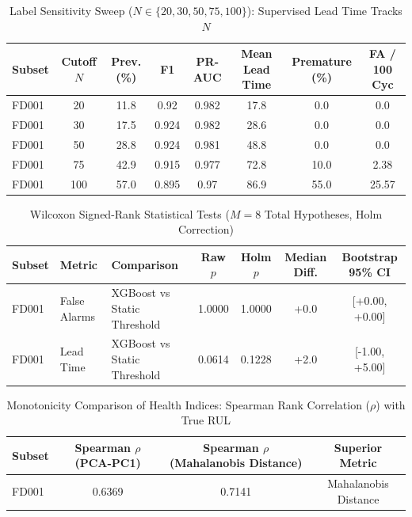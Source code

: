 \begin{table}[htbp]
\centering
\small
\caption{Label Sensitivity Sweep ($N \in \{20, 30, 50, 75, 100\}$): Supervised Lead Time Tracks $N$}
\label{tab:label_sensitivity_sweep}
\begin{tabular}{lccccccc}
\toprule
\textbf{Subset} & \textbf{Cutoff $N$} & \textbf{Prev. (\%)} & \textbf{F1} & \textbf{PR-AUC} & \textbf{Mean Lead Time} & \textbf{Premature (\%)} & \textbf{FA / 100 Cyc} \\
\midrule
FD001 & 20 & 11.8 & 0.92 & 0.982 & 17.8 & 0.0 & 0.0 \\
FD001 & 30 & 17.5 & 0.924 & 0.982 & 28.6 & 0.0 & 0.0 \\
FD001 & 50 & 28.8 & 0.924 & 0.981 & 48.8 & 0.0 & 0.0 \\
FD001 & 75 & 42.9 & 0.915 & 0.977 & 72.8 & 10.0 & 2.38 \\
FD001 & 100 & 57.0 & 0.895 & 0.97 & 86.9 & 55.0 & 25.57 \\
\bottomrule
\end{tabular}
\end{table}


\begin{table}[htbp]
\centering
\small
\caption{Wilcoxon Signed-Rank Statistical Tests ($M=8$ Total Hypotheses, Holm Correction)}
\label{tab:wilcoxon_tests}
\begin{tabular}{lllcccc}
\toprule
\textbf{Subset} & \textbf{Metric} & \textbf{Comparison} & \textbf{Raw $p$} & \textbf{Holm $p$} & \textbf{Median Diff.} & \textbf{Bootstrap 95\% CI} \\
\midrule
FD001 & False Alarms & XGBoost vs Static Threshold & 1.0000 & 1.0000 & +0.0 & [+0.00, +0.00] \\
FD001 & Lead Time & XGBoost vs Static Threshold & 0.0614 & 0.1228 & +2.0 & [-1.00, +5.00] \\
\bottomrule
\end{tabular}
\end{table}


\begin{table}[htbp]
\centering
\small
\caption{Monotonicity Comparison of Health Indices: Spearman Rank Correlation ($\rho$) with True RUL}
\label{tab:health_index_spearman}
\begin{tabular}{lccc}
\toprule
\textbf{Subset} & \textbf{Spearman $\rho$ (PCA-PC1)} & \textbf{Spearman $\rho$ (Mahalanobis Distance)} & \textbf{Superior Metric} \\
\midrule
FD001 & 0.6369 & 0.7141 & Mahalanobis Distance \\
\bottomrule
\end{tabular}
\end{table}


